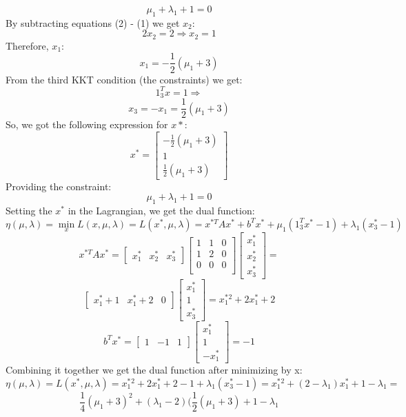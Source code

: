 \documentclass[12pt]{article}
\begin{document}
\begin{equation}
\mu_1 + \lambda_1 + 1 = 0
\end{equation}
By subtracting equations (2) - (1) we get $x_2$:
$$2x_2 = 2 \Rightarrow x_2 = 1$$
Therefore, $x_1$:
$$x_1 = -\frac{1}{2}(\mu_1+3)$$
From the third KKT condition (the constraints) we get:
$$1_3^T x = 1 \Rightarrow$$
$$x_3 = -x_1 = \frac{1}{2}(\mu_1+3)$$
So, we got the following expression for $x*$:
$$x^* = \begin{bmatrix}  -\frac{1}{2}(\mu_1+3) \\ 1 \\ \frac{1}{2}(\mu_1+3) \end{bmatrix}$$
Providing the constraint:
$$\mu_1 + \lambda_1 + 1 = 0$$
Setting the $x^*$ in the Lagrangian, we get the dual function:
$$\eta(\mu,\lambda) = \min _x L(x,\mu,\lambda) = L(x^*,\mu,\lambda) = x^{*T} A x^* + b^T x^* + \mu_1 (1_3^T x^* - 1) + \lambda_1 (x^*_3-1)$$
$$x^{*T} A x^* = \begin{bmatrix}  x^*_1 & x^*_2 & x^*_3 \end{bmatrix} 
\begin{bmatrix} 1 & 1 & 0 \\ 1 & 2 & 0 \\ 0 & 0 & 0 \\ \end{bmatrix} 
\begin{bmatrix}  x^*_1 \\ x^*_2 \\ x^*_3 \end{bmatrix} = $$
$$\begin{bmatrix} x^*_1+1  & x^*_1+2 & 0 \end{bmatrix}
\begin{bmatrix}  x^*_1 \\ 1 \\ x^*_3 \end{bmatrix}
 =x^*_1^2 + 2x^*_1 + 2$$
$$ b^T x^* = \begin{bmatrix}  1 & -1 & 1 \end{bmatrix} \begin{bmatrix}  x^*_1 \\ 1 \\ -x^*_1 \end{bmatrix} = -1$$
Combining it together we get the dual function after minimizing by x:
$$\eta(\mu,\lambda) =  L(x^*,\mu,\lambda) = x^*_1^2 + 2x^*_1 + 2 - 1 + \lambda_1 (x^*_3-1) = x^*_1^2 + (2-\lambda_1) x^*_1 + 1 - \lambda_1  =$$
$$\frac{1}{4}(\mu_1 + 3)^2 + (\lambda_1-2) (\frac{1}{2}(\mu_1+3) + 1 - \lambda_1$$
\end{document}
